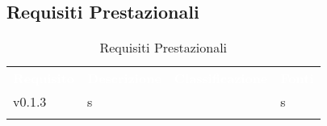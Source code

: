 \subsection{Requisiti Prestazionali}




\renewcommand{\arraystretch}{1.5}
\begin{longtable}{ m{}<{\centering}  m{}<{\centering}  m{}<{\centering}  m{}<{\centering}}
	\rowcolor{darkblue}
	\textcolor{white}{\textbf{Requisito}} &\textcolor{white}{\textbf{Descrizione}}& \textcolor{white}{\textbf{Classificazione}} & \textcolor{white}{\textbf{Fonti}}\\ 

	v0.1.3 & s & \Ob & s\\		

	\hiderowcolors \caption{Requisiti Prestazionali}
\end{longtable}